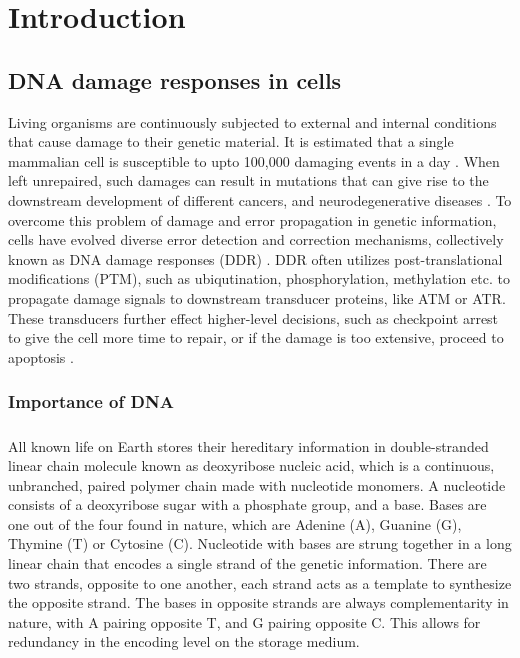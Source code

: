 \chapter{Introduction}
\section{DNA damage responses in cells}
Living organisms are continuously subjected to external and internal conditions that cause damage to their genetic material. It is estimated that a single mammalian cell is susceptible to upto 100,000 damaging events in a day \cite{ciccia2010dna}. When left unrepaired, such damages can result in mutations that can give rise to the downstream development of different cancers, and neurodegenerative diseases \cite{friedberg2005dna}. To overcome this problem of damage and error propagation in genetic information, cells have evolved diverse error detection and correction mechanisms, collectively known as DNA damage responses (DDR) \cite{hoeijmakers2009dna}. DDR often utilizes post-translational modifications (PTM), such as ubiqutination, phosphorylation, methylation etc. to propagate damage signals to downstream transducer proteins, like ATM or ATR. These transducers further effect higher-level decisions, such as checkpoint arrest to give the cell more time to repair, or if the damage is too extensive, proceed to apoptosis \cite{derks2014dna}.

\subsection{Importance of DNA}
\paragraph*{} All known life on Earth stores their hereditary information in double-stranded linear chain molecule known as deoxyribose nucleic acid, which is a continuous, unbranched, paired polymer chain made with nucleotide monomers. A nucleotide consists of a deoxyribose sugar with a phosphate group, and a base. Bases are one out of the four found in nature, which are Adenine (A), Guanine (G), Thymine (T) or Cytosine (C). Nucleotide with bases are strung together in a long linear chain that encodes a single strand of the genetic information. There are two strands, opposite to one another, each strand acts as a template to synthesize the opposite strand. The bases in opposite strands are always complementarity in nature, with A pairing opposite T, and G pairing opposite C. This allows for redundancy in the encoding level on the storage medium.

